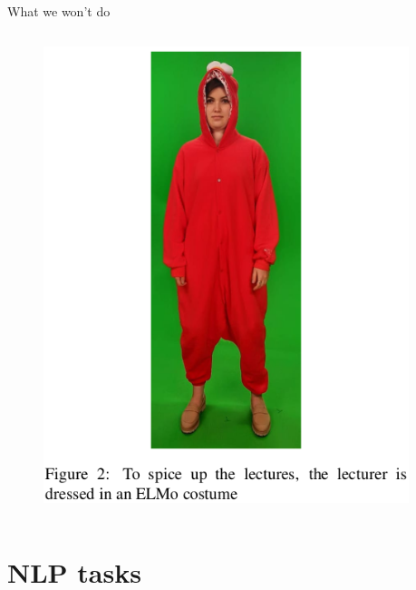 \documentclass[12pt]{beamer}
\begin{document}
\begin{frame}{What we won't do}

\begin{columns}
	\begin{column}{0.4\linewidth}
		\begin{figure}
			\includegraphics[width=1\linewidth]{img/elmo-workshop-teaching.png}
		\end{figure}
	\end{column}

\begin{column}{0.6\linewidth}
\begin{footnotesize}
\end{footnotesize}

\end{column}
\end{columns}

	
\end{frame}

\section{NLP tasks}
\end{document}
